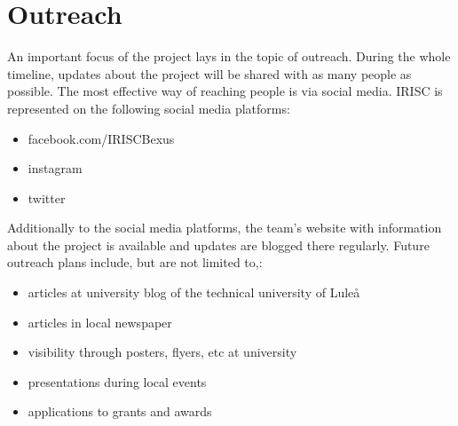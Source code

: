 \newpage
\section{Outreach} \label{sec:appB}
An important focus of the project lays in the topic of outreach. During the whole timeline, updates about the project will be shared with as many people as possible. The most effective way of reaching people is via social media. IRISC is represented on the following social media platforms:
\begin{itemize}
	\item facebook.com/IRISCBexus
	\item instagram
	\item twitter
\end{itemize}
Additionally to the social media platforms, the team's website with information about the project is available and updates are blogged there regularly.\newline\newline
Future outreach plans include, but are not limited to,:
\begin{itemize}
	\item articles at university blog of the technical university of Lule\aa
	\item articles in local newspaper
	\item visibility through posters, flyers, etc at university
	\item presentations during local events
	\item applications to grants and awards
\end{itemize}
